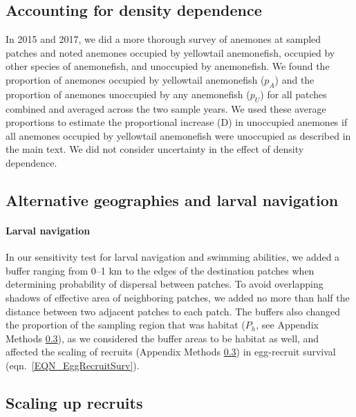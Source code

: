 \documentclass[12pt, oneside]{article}   	%
\begin{document}
\subsection{Accounting for density dependence} \label{APP_SEC_METHODS_DD}

In 2015 and 2017, we did a more thorough survey of anemones at sampled patches and noted anemones occupied by yellowtail anemonefish, occupied by other species of anemonefish, and unoccupied by anemonefish. We found the proportion of anemones occupied by yellowtail anemonefish ($p_A$) and the proportion of anemones unoccupied by any anemonefish ($p_U$) for all patches combined and averaged across the two sample years. We used these average proportions to estimate the proportional increase (D) in unoccupied anemones if all anemones occupied by yellowtail anemonefish were unoccupied as described in the main text. We did not consider uncertainty in the effect of density dependence.

\subsection{Alternative geographies and larval navigation} \label{APP_SEC_METHODS_Larval_nav}

\paragraph*{Larval navigation} 

In our sensitivity test for larval navigation and swimming abilities, we added a buffer ranging from 0--1 km to the edges of the destination patches when determining probability of dispersal between patches. To avoid overlapping shadows of effective area of neighboring patches, we added no more than half the distance between two adjacent patches to each patch. The buffers also changed the proportion of the sampling region that was habitat ($P_h$, see Appendix Methods \ref{APP_SEC_METHODS_ScalingUpRecruits}), as we considered the buffer areas to be habitat as well, and affected the scaling of recruits (Appendix Methods \ref{APP_SEC_METHODS_ScalingUpRecruits}) in egg-recruit survival (eqn.\ \ref{EQN_EggRecruitSurv}).

\subsection{Scaling up recruits} \label{APP_SEC_METHODS_ScalingUpRecruits}
\end{document}

